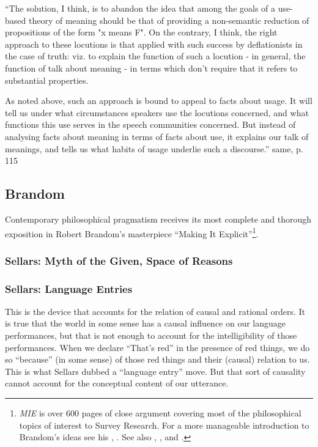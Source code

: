 \documentclass[11pt,twoside]{article}
\newcommand{\SR}{Survey Research}
\newcommand{\MIE}{\textit{MIE}}
\begin{document}
``The solution, I think, is to abandon the idea that among the goals of a use-based theory of meaning should be that of providing a non-semantic reduction of propositions of the form "x means F". On the contrary, I think, the right approach to these locutions is that applied with such success by deflationists in the case of truth: viz. to explain the function of such a locution - in general, the function of talk about meaning - in terms which don't require that it refers to substantial properties.

As noted above, such an approach is bound to appeal to facts about usage. It will tell us under what circumstances speakers use the locutions concerned, and what functions this use serves in the speech communities concerned. But instead of analysing facts about meaning in terms of facts about use, it explains our talk of meanings, and tells us what habits of usage underlie such a discourse.'' same, p. 115


\subsection{Brandom}

Contemporary philosophical pragmatism receives its most complete and
thorough exposition in Robert Brandom's masterpiece \enquote{Making It
  Explicit}\footnote{\MIE{} is over 600 pages of close argument covering most of the philosophical topics of interest to \SR{}.  For a more manageable introduction to Brandom's ideas see his \parencite{brandom_precis_1997}, \parencite{brandom_articulating_2001}.  See also \parencite{brandom_perspectives_2011}, \parencite{brandom_reason_2009}, and \parencite{brandom_between_2008}.}.

\subsubsection{Sellars: Myth of the Given, Space of Reasons}

\subsubsection{Sellars: Language Entries}

This is the device that accounts for the relation of causal and
rational orders.  It is true that the world in some sense has a causal
influence on our language performances, but that is not enough to
account for the intelligibility of those performances.  When we
declare ``That's red'' in the presence of red things, we do so
``because'' (in some sense) of those red things and their (causal)
relation to us.  This is what Sellars dubbed a ``language entry''
move.  But that sort of causality cannot account for the conceptual
content of our utterance.
\end{document}
